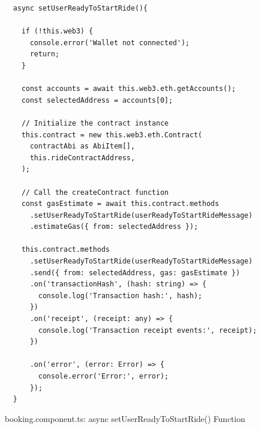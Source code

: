 

\begin{Listing}
\begin{lstlisting}
  async setUserReadyToStartRide(){

    if (!this.web3) {
      console.error('Wallet not connected');
      return;
    }

    const accounts = await this.web3.eth.getAccounts();
    const selectedAddress = accounts[0];

    // Initialize the contract instance
    this.contract = new this.web3.eth.Contract(
      contractAbi as AbiItem[],
      this.rideContractAddress,
    );

    // Call the createContract function
    const gasEstimate = await this.contract.methods
      .setUserReadyToStartRide(userReadyToStartRideMessage)
      .estimateGas({ from: selectedAddress });

    this.contract.methods
      .setUserReadyToStartRide(userReadyToStartRideMessage)
      .send({ from: selectedAddress, gas: gasEstimate })
      .on('transactionHash', (hash: string) => {
        console.log('Transaction hash:', hash);
      })
      .on('receipt', (receipt: any) => {
        console.log('Transaction receipt events:', receipt);
      })

      .on('error', (error: Error) => {
        console.error('Error:', error);
      });
  }
\end{lstlisting}
  \caption{booking.component.ts:   async setUserReadyToStartRide() Function}
  \label{lst:claimETH}
\end{Listing}

